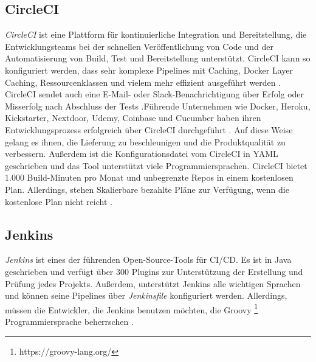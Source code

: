 \subsection{CircleCI}

\textit{CircleCI} ist eine Plattform für kontinuierliche Integration und Bereitstellung, die Entwicklungsteams bei der schnellen Veröffentlichung von Code und der Automatisierung von Build, Test und Bereitstellung unterstützt. CircleCI kann so konfiguriert werden, dass sehr komplexe Pipelines mit Caching, Docker Layer Caching, Ressourcenklassen und vielem mehr effizient ausgeführt werden \cite{CircleCI:homepage}.
CircleCI sendet auch eine E-Mail- oder Slack-Benachrichtigung über Erfolg oder Misserfolg nach Abschluss der Tests \cite{CircleCI:notifications}.Führende Unternehmen wie Docker, Heroku, Kickstarter, Nextdoor, Udemy, Coinbase und Cucumber haben ihren Entwicklungsprozess erfolgreich über CircleCI durchgeführt \cite{CircleCI:customers}. Auf diese Weise gelang es ihnen, die Lieferung zu beschleunigen und die Produktqualität zu verbessern.
\newline
Außerdem ist die Konfigurationsdatei vom CircleCI in YAML geschrieben und das Tool unterstützt viele Programmiersprachen. CircleCI bietet 1.000 Build-Minuten pro Monat und unbegrenzte Repos in einem kostenlosen Plan. Allerdings, stehen Skalierbare bezahlte Pläne zur Verfügung, wenn die kostenlose Plan nicht reicht \cite{CircleCI:pricing}.

\subsection{Jenkins}

\textit{Jenkins} ist eines der führenden Open-Source-Tools für \ac{CI/CD}. Es ist in Java geschrieben und verfügt über 300 Plugins zur Unterstützung der Erstellung und Prüfung jedes Projekts. Außerdem, unterstützt Jenkins alle wichtigen Sprachen und können seine Pipelines über \textit{Jenkinsfile} konfiguriert werden. Allerdings, müssen die Entwickler, die Jenkins benutzen möchten, die Groovy \footnote{https://groovy-lang.org/} Programmiersprache beherrschen \cite{Jenkins:pipeline}.
